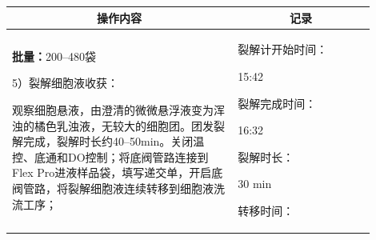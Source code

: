 \documentclass[UTF8,10pt,a4paper,fontset=fandol]{ctexart}
\newcommand{\fieldvalue}[1]{#1}
\newcommand{\handwritten}[1]{#1}
\begin{document}
\begin{tabular}{|p{0.56\linewidth}|p{0.34\linewidth}|}
\hline
\multicolumn{1}{|c|}{\textbf{操作内容}} &
\multicolumn{1}{c|}{\textbf{记录}} \\
\hline
\begin{minipage}[t]{0.53\linewidth}
\vspace{2pt}
\textbf{批量：}\fieldvalue{200--480袋}

\vspace{4pt}
5）裂解细胞液收获：

观察细胞悬液，由澄清的微微悬浮液变为浑浊的橘色乳浊液，无较大的细胞团。团发裂解完成，裂解时长约40--50min。关闭温控、底通和DO控制；将底阀管路连接到 Flex Pro进液样品袋，填写递交单，开启底阀管路，将裂解细胞液连续转移到细胞液洗流工序；
\vspace{2pt}
\end{minipage}
&
\begin{minipage}[t]{0.31\linewidth}
\vspace{2pt}
裂解计开始时间：

\fieldvalue{\handwritten{15:42}}

\vspace{5pt}
裂解完成时间：

\fieldvalue{\handwritten{16:32}}

\vspace{5pt}
裂解时长：

\fieldvalue{\handwritten{30}} min

\vspace{5pt}
转移时间：


\end{minipage}
\end{tabular}
\end{document}
